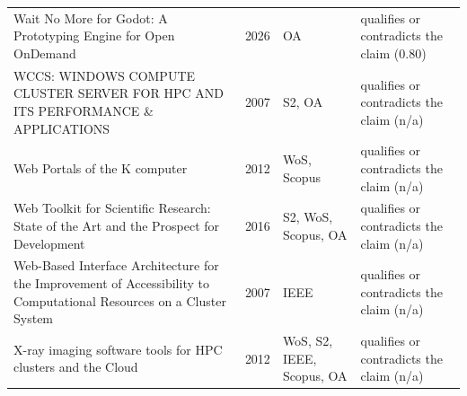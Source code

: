 \begin{longtable}{@{}%
  >{\raggedright\arraybackslash}p{}c%
  >{\raggedright\arraybackslash}p{}%
  >{\raggedright\arraybackslash}p{}@{}}
Wait No More for Godot: A Prototyping Engine for Open OnDemand & 2026 & OA & qualifies or contradicts the claim (0.80) \\
WCCS: WINDOWS COMPUTE CLUSTER SERVER FOR HPC AND ITS PERFORMANCE \& APPLICATIONS & 2007 & S2, OA & qualifies or contradicts the claim (n/a) \\
Web Portals of the K computer & 2012 & WoS, Scopus & qualifies or contradicts the claim (n/a) \\
Web Toolkit for Scientific Research: State of the Art and the Prospect for Development & 2016 & S2, WoS, Scopus, OA & qualifies or contradicts the claim (n/a) \\
Web-Based Interface Architecture for the Improvement of Accessibility to Computational Resources on a Cluster System & 2007 & IEEE & qualifies or contradicts the claim (n/a) \\
X-ray imaging software tools for HPC clusters and the Cloud & 2012 & WoS, S2, IEEE, Scopus, OA & qualifies or contradicts the claim (n/a) \\
\end{longtable}
\endgroup
